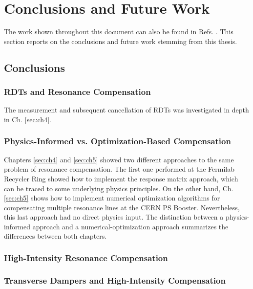 \chapter{Conclusions and Future Work}
\label{sec:ch7}

The work shown throughout this document can also be found in Refs. \cite{cris1,cris2, cris3}. This section reports on the conclusions and future work stemming from this thesis.

\section{Conclusions}

\subsection{RDTs and Resonance Compensation}

The measurement and subsequent cancellation of RDTs was investigated in depth in Ch. \ref{sec:ch4}.

\subsection{Physics-Informed vs. Optimization-Based Compensation}

Chapters \ref{sec:ch4} and \ref{sec:ch5} showed two different approaches to the same problem of resonance compensation. The first one performed at the Fermilab Recycler Ring showed how to implement the response matrix approach, which can be traced to some underlying physics principles. On the other hand, Ch. \ref{sec:ch5} shows how to implement numerical optimization algorithms for compensating multiple resonance lines at the CERN PS Booster. Nevertheless, this last approach had no direct physics input. The distinction between a physics-informed approach and a numerical-optimization approach summarizes the differences between both chapters. 

\subsection{High-Intensity Resonance Compensation}

\subsection{Transverse Dampers and High-Intensity Compensation}

